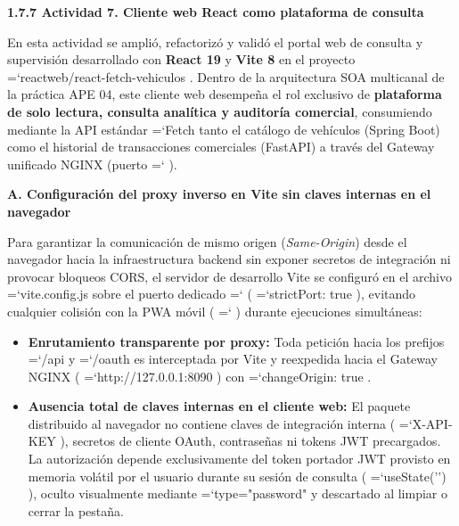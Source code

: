 \documentclass[11pt,a4paper]{article}
\makeatletter
\newcommand{\FloatBarrier}{%
  \par
  \ifx\@deferlist\@empty\else
    \clearpage
  \fi
}
\renewcommand{\_}{\oldunderscore\allowbreak}
\DeclareRobustCommand{\texttt}[1]{%
  {\upshape\ttfamily\fontsize{9}{10.8}\selectfont\hyphenchar\font=`\-\relax #1}%
}
\makeatother
\begin{document}
\vspace{0.4cm}
\FloatBarrier
\noindent\textbf{1.7.7 Actividad 7. Cliente web React como plataforma de consulta}

\vspace{0.2cm}
\noindent En esta actividad se amplió, refactorizó y validó el portal web de consulta y supervisión desarrollado con \textbf{React 19} y \textbf{Vite 8} en el proyecto \texttt{reactweb/\allowbreak{}react-fetch-vehiculos}. Dentro de la arquitectura SOA multicanal de la práctica APE 04, este cliente web desempeña el rol exclusivo de \textbf{plataforma de solo lectura, consulta analítica y auditoría comercial}, consumiendo mediante la API estándar \texttt{Fetch} tanto el catálogo de vehículos (Spring Boot) como el historial de transacciones comerciales (FastAPI) a través del Gateway unificado NGINX (puerto \texttt{8090}).

\vspace{0.2cm}
\noindent\textbf{A. Configuración del proxy inverso en Vite sin claves internas en el navegador}

\noindent Para garantizar la comunicación de mismo origen (\textit{Same-Origin}) desde el navegador hacia la infraestructura backend sin exponer secretos de integración ni provocar bloqueos CORS, el servidor de desarrollo Vite se configuró en el archivo \texttt{vite.\allowbreak{}config.\allowbreak{}js} sobre el puerto dedicado \texttt{5174} (\texttt{strictPort: true}), evitando cualquier colisión con la PWA móvil (\texttt{5173}) durante ejecuciones simultáneas:
\begin{itemize}[leftmargin=*,itemsep=2pt,topsep=1pt]
  \item \textbf{Enrutamiento transparente por proxy:} Toda petición hacia los prefijos \texttt{/api} y \texttt{/oauth} es interceptada por Vite y reexpedida hacia el Gateway NGINX (\texttt{http:\allowbreak{}/\allowbreak{}/\allowbreak{}127.\allowbreak{}0.\allowbreak{}0.\allowbreak{}1:\allowbreak{}8090}) con \texttt{changeOrigin: true}.
  \item \textbf{Ausencia total de claves internas en el cliente web:} El paquete distribuido al navegador no contiene claves de integración interna (\texttt{X-API-KEY}), secretos de cliente OAuth, contraseñas ni tokens JWT precargados. La autorización depende exclusivamente del token portador JWT provisto en memoria volátil por el usuario durante su sesión de consulta (\texttt{useState('')}), oculto visualmente mediante \texttt{type=\allowbreak{}"password"} y descartado al limpiar o cerrar la pestaña.
\end{itemize}
\end{document}
